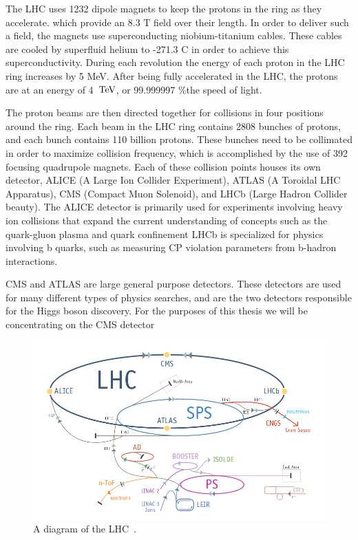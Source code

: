The LHC uses 1232 dipole magnets to keep the protons in the ring as they accelerate. which provide an 8.3 T field over their length.  
In order to deliver such a field, the magnets use superconducting niobium-titanium cables.  
These cables are cooled by superfluid helium to -271.3 C in order to achieve this superconductivity.  
During each revolution the energy of each proton in the LHC ring increases by 5 MeV.  
After being fully accelerated in the LHC, the protons are at an energy of 4~$\mathrm{TeV}$, or 99.999997 \%the speed of light.

The proton beams are then directed together for collisions in four positions around the ring.  
Each beam in the LHC ring contains 2808 bunches of protons, and each bunch contains 110 billion protons. 
These bunches need to be collimated in order to maximize collision frequency, which is accomplished by the use of 392 focusing quadrupole magnets.   
Each of these collision points houses its own detector, ALICE (A Large Ion Collider Experiment), ATLAS (A Toroidal LHC Apparatus), 
CMS (Compact Muon Solenoid), and LHCb (Large Hadron Collider beauty).  
The ALICE detector is primarily used for experiments involving heavy ion collisions that expand the current 
understanding of concepts such as the quark-gluon plasma and quark confinement   
LHCb is specialized for physics involving b quarks, such as measuring CP violation parameters from b-hadron interactions.  

CMS and ATLAS are large general purpose detectors.  
These detectors are used for many different types of physics searches, and are the two detectors responsible for the Higgs boson discovery.  
For the purposes of this thesis we will be concentrating on the CMS detector
  


\begin{figure}
\begin{center}
\includegraphics[width=1.0\linewidth]{figs/lhc.png}
\caption{A diagram of the LHC~\cite{lhcbrochure}.}
\label{figs:lhc}
\end{center}
\end{figure}

